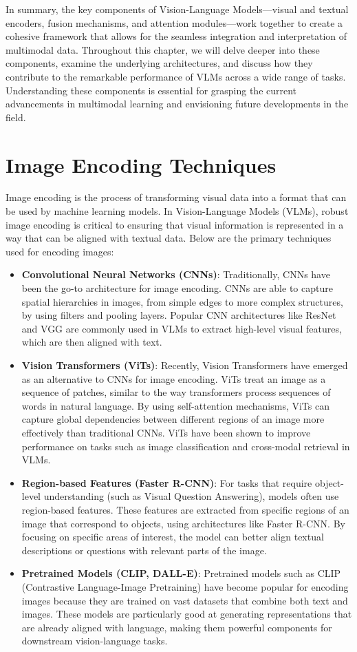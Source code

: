 In summary, the key components of Vision-Language Models—visual and textual encoders, fusion mechanisms, and attention modules—work together to create a cohesive framework that allows for the seamless integration and interpretation of multimodal data. Throughout this chapter, we will delve deeper into these components, examine the underlying architectures, and discuss how they contribute to the remarkable performance of VLMs across a wide range of tasks. Understanding these components is essential for grasping the current advancements in multimodal learning and envisioning future developments in the field.

\section{Image Encoding Techniques}

Image encoding is the process of transforming visual data into a format that can be used by machine learning models. In Vision-Language Models (VLMs), robust image encoding is critical to ensuring that visual information is represented in a way that can be aligned with textual data. Below are the primary techniques used for encoding images:

\begin{itemize}
    \item \textbf{Convolutional Neural Networks (CNNs)}: Traditionally, CNNs have been the go-to architecture for image encoding. CNNs are able to capture spatial hierarchies in images, from simple edges to more complex structures, by using filters and pooling layers. Popular CNN architectures like ResNet and VGG are commonly used in VLMs to extract high-level visual features, which are then aligned with text.
    \item \textbf{Vision Transformers (ViTs)}: Recently, Vision Transformers have emerged as an alternative to CNNs for image encoding. ViTs treat an image as a sequence of patches, similar to the way transformers process sequences of words in natural language. By using self-attention mechanisms, ViTs can capture global dependencies between different regions of an image more effectively than traditional CNNs. ViTs have been shown to improve performance on tasks such as image classification and cross-modal retrieval in VLMs.
    \item \textbf{Region-based Features (Faster R-CNN)}: For tasks that require object-level understanding (such as Visual Question Answering), models often use region-based features. These features are extracted from specific regions of an image that correspond to objects, using architectures like Faster R-CNN. By focusing on specific areas of interest, the model can better align textual descriptions or questions with relevant parts of the image.
    \item \textbf{Pretrained Models (CLIP, DALL-E)}: Pretrained models such as CLIP (Contrastive Language-Image Pretraining) have become popular for encoding images because they are trained on vast datasets that combine both text and images. These models are particularly good at generating representations that are already aligned with language, making them powerful components for downstream vision-language tasks.
\end{itemize}

